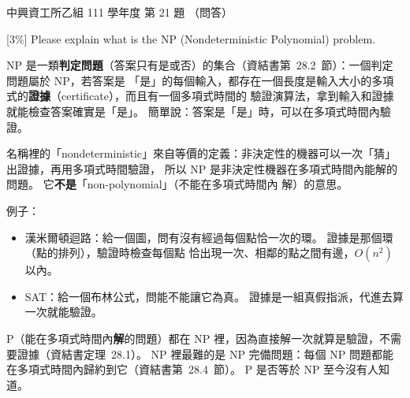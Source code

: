 \begin{pastexam}[label={px:nchu-111-is-10}]{中興資工所乙組 111 學年度 第 21 題}
（問答）

{[3\%]} Please explain what is the NP (Nondeterministic Polynomial) problem.
\end{pastexam}

\begin{pastsoln}
NP 是一類\textbf{判定問題}（答案只有是或否）的集合（資結書第~28.2~節）：一個判定問題屬於 NP，若答案是
「是」的每個輸入，都存在一個長度是輸入大小的多項式的\textbf{證據}（certificate），而且有一個多項式時間的
驗證演算法，拿到輸入和證據就能檢查答案確實是「是」。 簡單說：答案是「是」時，可以在多項式時間內驗證。

名稱裡的「nondeterministic」來自等價的定義：非決定性的機器可以一次「猜」出證據，再用多項式時間驗證，
所以 NP 是非決定性機器在多項式時間內能解的問題。 它\textbf{不是}「non-polynomial」（不能在多項式時間內
解）的意思。

例子：
\begin{itemize}
\item 漢米爾頓迴路：給一個圖，問有沒有經過每個點恰一次的環。 證據是那個環（點的排列），驗證時檢查每個點
恰出現一次、相鄰的點之間有邊，$O(n^2)$ 以內。
\item SAT：給一個布林公式，問能不能讓它為真。 證據是一組真假指派，代進去算一次就能驗證。
\end{itemize}
P（能在多項式時間內\textbf{解}的問題）都在 NP 裡，因為直接解一次就算是驗證，不需要證據（資結書定理~28.1）。
NP 裡最難的是 NP 完備問題：每個 NP 問題都能在多項式時間內歸約到它（資結書第~28.4~節）。 P 是否等於 NP
至今沒有人知道。
\end{pastsoln}
